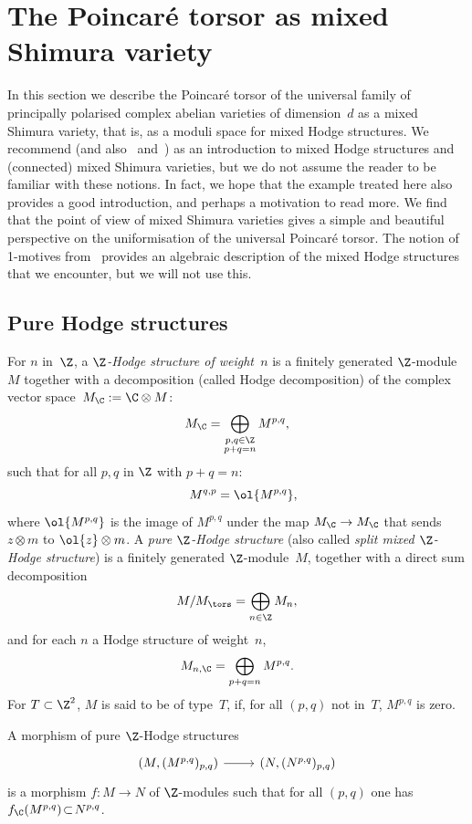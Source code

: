 \section{The Poincaré torsor as mixed Shimura variety}\label{sec4}
In this section we describe the Poincaré torsor of the universal
family of principally polarised complex abelian varieties of
dimension~$d$ as a mixed Shimura variety, that is, as a moduli space
for mixed Hodge structures. We recommend \cite[\S 2]{Pink1} (and
also~\cite{Klingler} and~\cite{HodgeII}) as an introduction to mixed
Hodge structures and (connected) mixed Shimura varieties, but we do
not assume the reader to be familiar with these notions. In fact, we
hope that the example treated here also provides a good introduction,
and perhaps a motivation to read more. We find that the point of view
of mixed Shimura varieties gives a simple and beautiful perspective on
the uniformisation of the universal Poincaré torsor. The notion of
1-motives from~\cite{HodgeIII} provides an algebraic description of
the mixed Hodge structures that we encounter, but we will not use this.

\subsection{Pure Hodge structures}
\label{sec:phs}
For $n$ in~$\Z$, a \emph{$\Z$-Hodge structure of weight~$n$} is a
finitely generated $\Z$-module $M$ together with a decomposition
(called Hodge decomposition) of the complex vector
space~$M_\C:=\C\otimes M$:
\[
M_\C = \bigoplus_{\substack{p,q\in\Z\\p+q=n}} M^{p,q},
\]
such that for all $p,q$ in $\Z$ with $p+q=n$:
\[
\quad M^{q,p}=\ol{M^{p,q}},
\]
where $\ol{M^{p,q}}$ is the image of $M^{p,q}$ under the map
$M_\C\to M_\C$ that sends $z\otimes m$ to $\ol{z}\otimes m$. A
\emph{pure $\Z$-Hodge structure} (also called \emph{split mixed
$\Z$-Hodge structure}) is a finitely generated $\Z$-module~$M$,
together with a direct sum decomposition
\[
M/M_\tors=\bigoplus_{n\in\Z}M_n,
\]
and for each $n$ a Hodge structure of weight~$n$,
\[
M_{n,\C}=\bigoplus_{p+q=n}M^{p,q}.
\]
For $T\subset\Z^2$, $M$ is said to be of type~$T$, if, for all $(p,q)$
not in~$T$, $M^{p,q}$ is zero.

A morphism of pure $\Z$-Hodge structures
\[
\begin{tikzcd}
(M,(M^{p,q})_{p,q}) \ar[r] & (N,(N^{p,q})_{p,q})
\end{tikzcd}
\]
is a morphism $f\colon M\!\to\!N$ of $\Z$-modules
such that for all $(p,q)$ one has $f_\C(M^{p,q})\!\subset\!N^{p,q}$.

